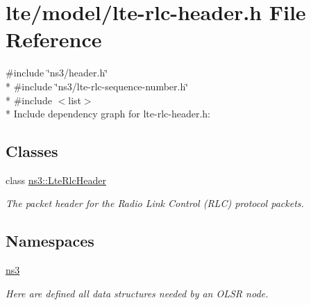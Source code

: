 \hypertarget{lte-rlc-header_8h}{}\section{lte/model/lte-\/rlc-\/header.h File Reference}
\label{lte-rlc-header_8h}
{\ttfamily \#include \char`\"{}ns3/header.\+h\char`\"{}}\\*
{\ttfamily \#include \char`\"{}ns3/lte-\/rlc-\/sequence-\/number.\+h\char`\"{}}\\*
{\ttfamily \#include $<$list$>$}\\*
Include dependency graph for lte-\/rlc-\/header.h\+:
\subsection*{Classes}
\begin{DoxyCompactItemize}
\item 
class \hyperlink{classns3_1_1LteRlcHeader}{ns3\+::\+Lte\+Rlc\+Header}
\begin{DoxyCompactList}\small\item\em The packet header for the Radio Link Control (R\+LC) protocol packets. \end{DoxyCompactList}\end{DoxyCompactItemize}
\subsection*{Namespaces}
\begin{DoxyCompactItemize}
\item 
 \hyperlink{namespacens3}{ns3}
\begin{DoxyCompactList}\small\item\em Here are defined all data structures needed by an O\+L\+SR node. \end{DoxyCompactList}\end{DoxyCompactItemize}
